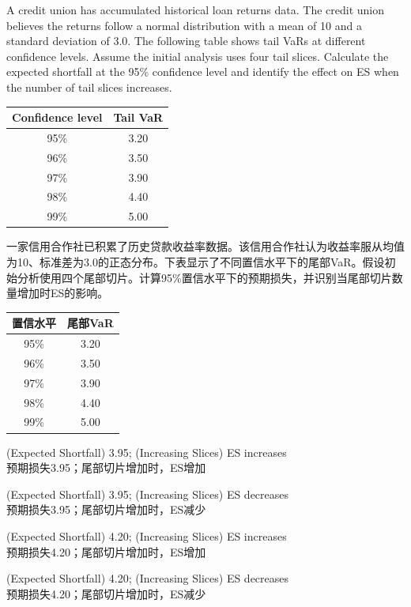 \documentclass{article}
\newcounter{question} %
\begin{document}
\begin{question}
    A credit union has accumulated historical loan returns data. The credit union believes the returns follow a normal distribution with a mean of 10 and a standard deviation of 3.0. The following table shows tail VaRs at different confidence levels. Assume the initial analysis uses four tail slices. Calculate the expected shortfall at the 95\% confidence level and identify the effect on ES when the number of tail slices increases.
    \begin{table}[H]
        \centering
        \begin{tabular}{|c|c|}
            \hline
            Confidence level & Tail VaR \\
            \hline
            95\% & 3.20 \\
            96\% & 3.50 \\
            97\% & 3.90 \\
            98\% & 4.40 \\
            99\% & 5.00 \\
            \hline
        \end{tabular}
    \end{table}
    一家信用合作社已积累了历史贷款收益率数据。该信用合作社认为收益率服从均值为10、标准差为3.0的正态分布。下表显示了不同置信水平下的尾部VaR。假设初始分析使用四个尾部切片。计算95\%置信水平下的预期损失，并识别当尾部切片数量增加时ES的影响。
    \begin{table}[H]
        \centering
        \begin{tabular}{|c|c|}
            \hline
            置信水平 & 尾部VaR \\
            \hline
            95\% & 3.20 \\
            96\% & 3.50 \\
            97\% & 3.90 \\
            98\% & 4.40 \\
            99\% & 5.00 \\
            \hline
        \end{tabular}
    \end{table}
\end{question}

\begin{choices}
    \item (Expected Shortfall) 3.95; (Increasing Slices) ES increases\\
    预期损失3.95；尾部切片增加时，ES增加
    \item (Expected Shortfall) 3.95; (Increasing Slices) ES decreases\\
    预期损失3.95；尾部切片增加时，ES减少
    \item (Expected Shortfall) 4.20; (Increasing Slices) ES increases\\
    预期损失4.20；尾部切片增加时，ES增加
    \item (Expected Shortfall) 4.20; (Increasing Slices) ES decreases\\
    预期损失4.20；尾部切片增加时，ES减少
\end{choices}
\end{document}
